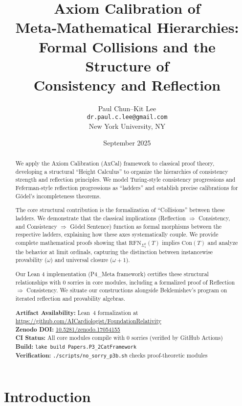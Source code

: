 \documentclass[11pt]{article}
\title{Axiom Calibration of Meta‑Mathematical Hierarchies:\\
Formal Collisions and the Structure of\\
Consistency and Reflection}
\author{Paul Chun--Kit Lee\\
\texttt{dr.paul.c.lee@gmail.com}\\
New York University, NY}
\date{September 2025}
\newcommand{\Con}{\mathrm{Con}}
\newcommand{\RFNSigOne}{\mathrm{RFN}_{\Sigma^0_1}}
\begin{document}
\maketitle

\begin{abstract}
We apply the Axiom Calibration (AxCal) framework to classical proof theory, developing a structural ``Height Calculus'' to organize the hierarchies of consistency strength and reflection principles. We model Turing-style consistency progressions and Feferman-style reflection progressions as ``ladders'' and establish precise calibrations for Gödel's incompleteness theorems.

The core structural contribution is the formalization of ``Collisions'' between these ladders. We demonstrate that the classical implications (Reflection $\Rightarrow$ Consistency, and Consistency $\Rightarrow$ Gödel Sentence) function as formal morphisms between the respective ladders, explaining how these axes systematically couple. We provide complete mathematical proofs showing that $\RFNSigOne(T)$ implies $\Con(T)$ and analyze the behavior at limit ordinals, capturing the distinction between instancewise provability ($\omega$) and universal closure ($\omega+1$).

Our Lean 4 implementation (P4\_Meta framework) certifies these structural relationships with 0 sorries in core modules, including a formalized proof of Reflection $\Rightarrow$ Consistency. We situate our constructions alongside Beklemishev's program on iterated reflection and provability algebras.

\vspace{1em}
\noindent\textbf{Artifact Availability:} Lean~4 formalization at \url{https://github.com/AICardiologist/FoundationRelativity}\\
\textbf{Zenodo DOI:} \href{https://doi.org/10.5281/zenodo.17054155}{10.5281/zenodo.17054155}\\
\textbf{CI Status:} All core modules compile with 0 sorries (verified by GitHub Actions)\\
\textbf{Build:} \texttt{lake build Papers.P3\_2CatFramework}\\
\textbf{Verification:} \texttt{./scripts/no\_sorry\_p3b.sh} checks proof-theoretic modules
\end{abstract}

\tableofcontents

\section{Introduction}
\end{document}
